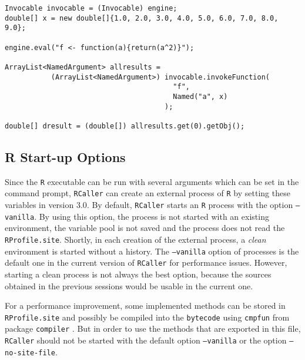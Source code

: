 \documentclass[10pt,a4paper, final, oneside]{article}
\begin{document}
\begin{minipage}{\linewidth}
\begin{lstlisting}[caption=Invoking user-defined functions,label=code_invoke_userfunction]
Invocable invocable = (Invocable) engine;
double[] x = new double[]{1.0, 2.0, 3.0, 4.0, 5.0, 6.0, 7.0, 8.0, 9.0};
        
engine.eval("f <- function(a){return(a^2)}");

ArrayList<NamedArgument> allresults = 
           (ArrayList<NamedArgument>) invocable.invokeFunction(
                                        "f", 
                                        Named("a", x)
                                      );
                                      
double[] dresult = (double[]) allresults.get(0).getObj();        
\end{lstlisting}
\end{minipage}
        
        
\subsection{R Start-up Options}
\label{sec:r_startup_options}
Since the \texttt{R} executable can be run with several arguments which can be set in the command prompt, \texttt{RCaller} can create an external process of \texttt{R} by setting these variables in version $3.0$. By default, \texttt{RCaller} starts an \texttt{R} process with the option \texttt{--vanilla}. By using this option, the process is not started with an existing environment, the variable pool is not saved and the process does not read the \texttt{RProfile.site}. Shortly, in each creation of the external process, a \textit{clean} environment is started without a history. The \texttt{--vanilla} option of processes is the default one in the current version of \texttt{RCaller} for performance issues. However, starting a clean process is not always the best option, because the sources obtained in the previous sessions would be usable in the current one.

For a performance improvement, some implemented methods can be stored in \texttt{RProfile.site} and possibly be compiled into the \texttt{bytecode} using \texttt{cmpfun} from package \texttt{compiler} \cite{lim2015r,tierney2001compiling}. But in order to use the methods that are exported in this file, \texttt{RCaller} should not be started with the default option \texttt{--vanilla} or the option \texttt{--no-site-file}. 
\end{document}

